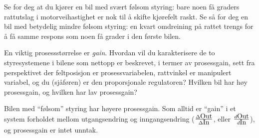 

Se for deg at du kjører en bil med svært følsom styring: bare noen få graders rattutslag i motorveihastighet er nok til å skifte kjørefelt raskt. Se så for deg en bil med betydelig mindre følsom styring: en kvart omdreining på rattet trengs for å få samme respons som noen få grader i den første bilen.

En viktig prosessstørrelse er {\it gain}. Hvordan vil du karakterisere de to styresystemene i bilene som nettopp er beskrevet, i termer av prosessgain, sett fra perspektivet der feltposisjon er prosessvariabelen, rattvinkel er manipulert variabel, og du (sjåføren) er den proporsjonale regulatoren? Hvilken bil har høy prosessgain, og hvilken har lav prosessgain?







Bilen med ``følsom'' styring har høyere prosessgain. Som alltid er ``gain'' i et system forholdet mellom utgangsendring og inngangsendring ($\Delta \hbox{Out} \over \Delta \hbox{In}$, eller $d \hbox{Out} \over d \hbox{In}$), og prosessgain er intet unntak.










